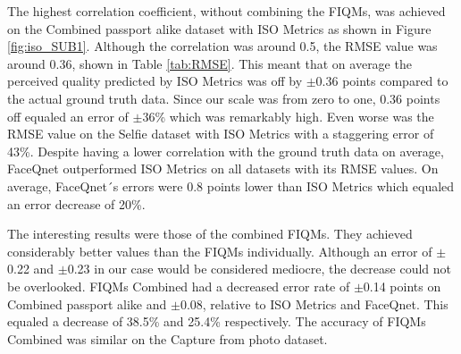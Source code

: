 \begin{table}[h]
\caption{The calculated RMSE values of the FIQMs on the datasets relative to the ground truth data. The RMSE value was not calculated for the Selfie dataset with the combined scores of the FIQMs. The `X' symbolises this.}
\label{tab:RMSE}
\end{table}
\noindent
The highest correlation coefficient, without combining the FIQMs, was achieved on the Combined passport alike dataset with ISO Metrics as shown in Figure \ref{fig:iso_SUB1}. Although the correlation was around 0.5, the RMSE value was around 0.36, shown in Table \ref{tab:RMSE}. This meant that on average the perceived quality predicted by ISO Metrics was off by $\pm$0.36 points compared to the actual ground truth data. Since our scale was from zero to one, 0.36 points off equaled an error of $\pm$36\% which was remarkably high. Even worse was the RMSE value on the Selfie dataset with ISO Metrics with a staggering error of 43\%. Despite having a lower correlation with the ground truth data on average, FaceQnet outperformed ISO Metrics on all datasets with its RMSE values. On average, FaceQnet´s errors were 0.8 points lower than ISO Metrics which equaled an error decrease of 20\%.  

The interesting results were those of the combined FIQMs. They achieved considerably better values than the FIQMs individually. Although an error of $\pm$0.22 and $\pm$0.23 in our case would be considered mediocre, the decrease could not be overlooked. FIQMs Combined had a decreased error rate of $\pm$0.14 points on Combined passport alike and $\pm$0.08, relative to ISO Metrics and FaceQnet. This equaled a decrease of 38.5\% and 25.4\% respectively. The accuracy of FIQMs Combined was similar on the Capture from photo dataset. 

